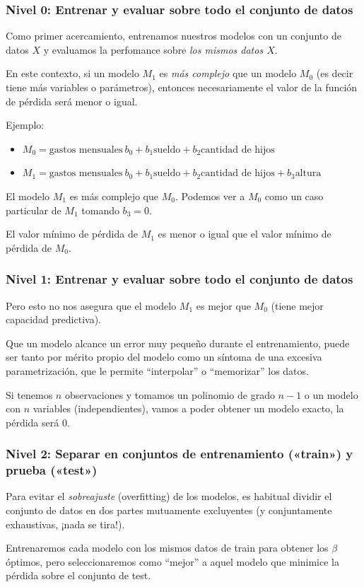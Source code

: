 \documentclass[aspectratio=169,12pt]{beamer}
\begin{document}
\begin{frame}
\frametitle{Nivel 0: Entrenar y evaluar sobre todo el conjunto de datos}

Como primer acercamiento, entrenamos nuestros modelos con un conjunto de datos $X$ y evaluamos la perfomance sobre \emph{los mismos datos $X$}.

En este contexto, si un modelo $M_1$ es \emph{más complejo} que un modelo $M_0$ (es decir tiene más variables o parámetros), entonces necesariamente el valor de la función de pérdida será menor o igual.

Ejemplo:
\begin{itemize}
\item $M_0 = \text{gastos mensuales} ~ b_0 + b_1 \text{sueldo} + b_2 \text{cantidad de hijos}$
\item $M_1 = \text{gastos mensuales} ~ b_0 + b_1 \text{sueldo} + b_2 \text{cantidad de hijos} + b_3 \text{altura}$
\end{itemize}

El modelo $M_1$ es m\'as complejo que $M_0$. Podemos ver a $M_0$ como un caso particular de $M_1$ tomando $b_3 = 0$.

El valor mínimo de pérdida de $M_1$ es menor o igual que el valor mínimo de pérdida de $M_0$.


\end{frame}



\begin{frame}
\frametitle{Nivel 1: Entrenar y evaluar sobre todo el conjunto de datos}

Pero esto no nos asegura que el modelo $M_1$ es mejor que $M_0$ (tiene mejor capacidad predictiva).

Que un modelo alcance un error muy pequeño durante el entrenamiento, puede ser tanto por mérito propio del modelo como un síntoma de una excesiva parametrización, que le permite ``interpolar'' o ``memorizar'' los datos.

Si tenemos $n$ observaciones y tomamos un polinomio de grado $n-1$ o un modelo con $n$ variables (independientes), vamos a poder obtener un modelo exacto, la pérdida será 0.

\end{frame}


\begin{frame}
\frametitle{Nivel 2: Separar en conjuntos de entrenamiento («train») y prueba («test»)}

Para evitar el \emph{sobreajuste} (overfitting) de los modelos, es habitual dividir el conjunto
de datos en dos partes mutuamente excluyentes (y conjuntamente exhaustivas, ¡nada
se tira!).

Entrenaremos cada modelo con los mismos datos de train para obtener los $\beta$
óptimos, pero seleccionaremos como ``mejor'' a aquel modelo que minimice la pérdida  sobre el conjunto de test.


\end{frame}
\end{document}
